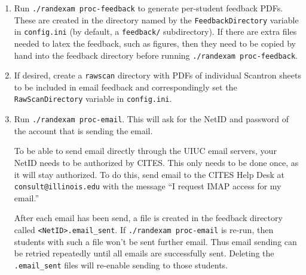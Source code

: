 \documentclass{article}
\begin{document}
\begin{enumerate}
\item Run \texttt{./randexam proc-feedback} to generate per-student
  feedback PDFs. These are created in the directory named by the
  \texttt{FeedbackDirectory} variable in \texttt{config.ini} (by
  default, a \texttt{feedback/} subdirectory). If there are extra
  files needed to latex the feedback, such as figures, then they need
  to be copied by hand into the feedback directory before running
  \texttt{./randexam proc-feedback}.
\item If desired, create a \verb+rawscan+ directory with PDFs of
  individual Scantron sheets to be included in email feedback and
  correspondingly set the \texttt{RawScanDirectory} variable in
  \texttt{config.ini}.
\item Run \texttt{./randexam proc-email}. This will ask for the NetID
  and password of the account that is sending the email.

  To be able to send email directly through the UIUC email servers,
  your NetID needs to be authorized by CITES. This only needs to be
  done once, as it will stay authorized. To do this, send email to the
  CITES Help Desk at \texttt{consult@illinois.edu} with the message
  ``I request IMAP access for my email.''

  After each email has been send, a file is created in the feedback
  directory called \texttt{<NetID>.email_sent}. If \texttt{./randexam
    proc-email} is re-run, then students with such a file won't be
  sent further email. Thus email sending can be retried repeatedly
  until all emails are successfully sent. Deleting the
  \texttt{.email_sent} files will re-enable sending to those students.
\end{enumerate}
\end{document}

